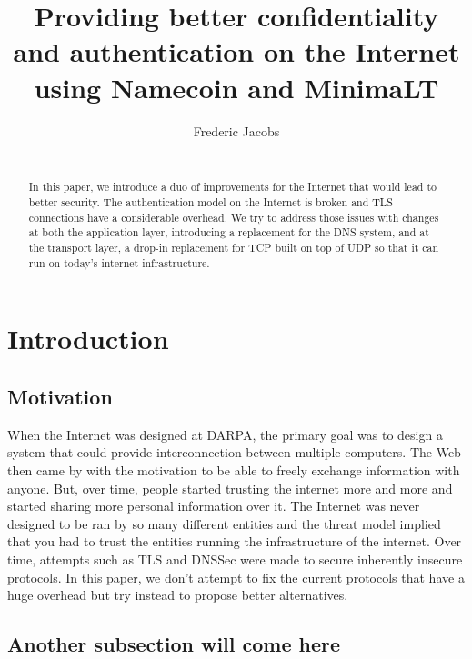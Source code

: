 \documentclass{vldb}
\begin{document}
\title{Providing better confidentiality and authentication on the Internet using Namecoin and MinimaLT}

\author{
\alignauthor
Frederic Jacobs\\
\\
}

\maketitle

\begin{abstract}
In this paper, we introduce a duo of improvements for the Internet that would lead to better security. The authentication model on the Internet is broken and TLS connections have a considerable overhead. We try to address those issues with changes at both the application layer, introducing a replacement for the DNS system, and at the transport layer, a drop-in replacement for TCP built on top of UDP so that it can run on today's internet infrastructure.

\end{abstract}

\section{Introduction}

\subsection{Motivation}

When the Internet was designed at DARPA, the primary goal was to design a system that could provide interconnection between multiple computers. The Web then came by with the motivation to be able to freely exchange information with anyone. But, over time, people started trusting the internet more and more and started sharing more personal information over it. The Internet was never designed to be ran by so many different entities and the threat model implied that you had to trust the entities running the infrastructure of the internet. Over time, attempts such as TLS and DNSSec were made to secure inherently insecure protocols. In this paper, we don't attempt to fix the current protocols that have a huge overhead but try instead to propose better alternatives.

\subsection{Another subsection will come here}
\end{document}
